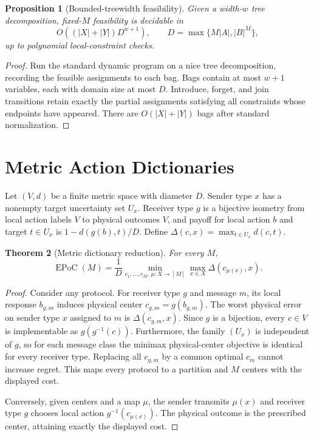\documentclass[letterpaper,10pt]{article}
\newtheorem{theorem}{Theorem}
\newtheorem{proposition}[theorem]{Proposition}
\newcommand{\EPoC}{\operatorname{EPoC}}
\begin{document}
\begin{proposition}[Bounded-treewidth feasibility]\label{prop:tw}
Given a width-$w$ tree decomposition, fixed-$M$ feasibility is decidable in
\[
O\!\left((|X|+|Y|)D^{w+1}\right),\qquad
D=\max\{M|A|,|B|^M\},
\]
up to polynomial local-constraint checks.
\end{proposition}
\begin{proof}
Run the standard dynamic program on a nice tree decomposition, recording the
feasible assignments to each bag. Bags contain at most $w+1$ variables, each
with domain size at most $D$. Introduce, forget, and join transitions retain
exactly the partial assignments satisfying all constraints whose endpoints
have appeared. There are $O(|X|+|Y|)$ bags after standard normalization.
\end{proof}

\section{Metric Action Dictionaries}

Let $(V,d)$ be a finite metric space with diameter $D$. Sender type $x$ has a
nonempty target uncertainty set $U_x$. Receiver type $g$ is a bijective isometry
from local action labels $V$ to physical outcomes $V$, and payoff for local
action $b$ and target $t\in U_x$ is $1-d(g(b),t)/D$. Define
$\Delta(c,x)=\max_{t\in U_x}d(c,t)$.

\begin{theorem}[Metric dictionary reduction]
For every $M$,
\[
\EPoC(M)=\frac{1}{D}
\min_{c_1,\ldots,c_M,\,\mu:X\to[M]}
\max_{x\in X}\Delta(c_{\mu(x)},x).
\]
\end{theorem}
\begin{proof}
Consider any protocol. For receiver type $g$ and message $m$, its local response
$b_{g,m}$ induces physical center $c_{g,m}=g(b_{g,m})$. The worst physical error
on sender type $x$ assigned to $m$ is $\Delta(c_{g,m},x)$. Since $g$ is a
bijection, every $c\in V$ is implementable as $g(g^{-1}(c))$. Furthermore, the
family $(U_x)$ is independent of $g$, so for each message class the minimax
physical-center objective is identical for every receiver type. Replacing all
$c_{g,m}$ by a common optimal $c_m$ cannot increase regret. This maps every
protocol to a partition and $M$ centers with the displayed cost.

Conversely, given centers and a map $\mu$, the sender transmits $\mu(x)$ and
receiver type $g$ chooses local action $g^{-1}(c_{\mu(x)})$. The physical
outcome is the prescribed center, attaining exactly the displayed cost.
\end{proof}
\end{document}
